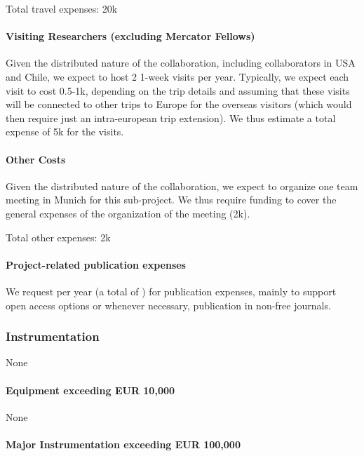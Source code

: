 \documentclass[10pt,fleqn,twoside]{article}
\begin{document}
\smallskip

Total travel expenses: 20k\EUR{}


\paragraph{Visiting Researchers (excluding Mercator Fellows)}
Given the distributed nature of the collaboration, including collaborators in USA and Chile, we expect to host 2 1-week visits per year. Typically, we expect each visit to cost 0.5-1k\EUR{}, depending on the trip details and assuming that these visits will be connected to other trips to Europe for the overseas visitors (which would then require just an intra-european trip extension). We thus estimate a total expense of 5k\EUR{} for the visits.


\paragraph{Other Costs}

Given the distributed nature of the collaboration, we expect to organize one team meeting in 
Munich for this sub-project. We thus require funding to cover the general expenses of the 
organization of the meeting (2k\EUR{}).\smallskip
 

Total other expenses: 2k\EUR{}

\paragraph{Project-related publication expenses}

We request  per year (a total of ) for publication
expenses, mainly to support open access options or whenever necessary,
publication in non-free journals.

\subsubsection{Instrumentation}

None

\paragraph{Equipment exceeding EUR 10,000} 

None

\paragraph{Major Instrumentation exceeding EUR 100,000} 
\end{document}
